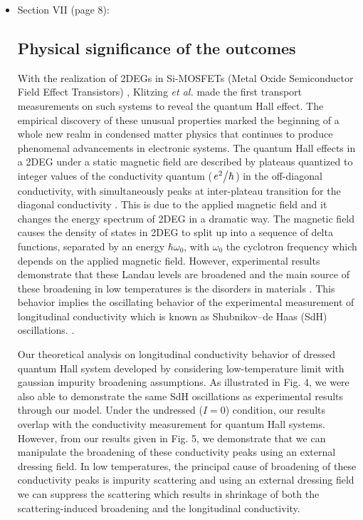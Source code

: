 \documentclass{article}
\begin{document}
\begin{itemize}
  \item Section VII (page 8):\\
  {\color{Maroon}
  \subsection*{Physical significance of the outcomes}

  With the realization of 2DEGs in Si-MOSFETs (Metal Oxide Semiconductor Field Effect Transistors) \cite{fowler66}, Klitzing \textit{et al.} \cite{klitzing80} made the first transport measurements on such systems to reveal the quantum Hall effect. The empirical discovery of these unusual properties marked the beginning of a whole new realm in condensed matter physics that continues to produce phenomenal advancements in electronic systems. The quantum Hall effects in a 2DEG under a static magnetic field are described by plateaus quantized to integer values of the conductivity quantum ($\flatfrac{e^2}{\hbar}$) in the off-diagonal conductivity, with simultaneously peaks at inter-plateau transition for the diagonal conductivity \cite{endo09}. This is due to the applied magnetic field and it changes the energy spectrum of 2DEG in a dramatic way. The magnetic field causes the density of states in 2DEG to split up into a sequence of delta functions, separated by an energy $\hbar\omega_0$, with $\omega_0$ the cyclotron frequency which depends on the applied magnetic field.
  However, experimental results demonstrate that these Landau levels are broadened and the main source of these broadening in low temperatures is the disorders in materials \cite{ando85,dial07}. This behavior implies the oscillating behavior of the experimental measurement of longitudinal conductivity which is known as Shubnikov–de Haas (SdH) oscillations. \cite{endo09,wakabayashi78}.

  Our theoretical analysis on longitudinal conductivity behavior of dressed quantum Hall system developed by considering low-temperature limit with gaussian impurity broadening assumptions. As illustrated in Fig. 4, we were also able to demonstrate the same SdH oscillations as experimental results \cite{endo09,wakabayashi78} through our model. Under the undressed ($I=0$) condition, our results overlap with the conductivity measurement for quantum Hall systems. However, from our results given in Fig. 5, we demonstrate that we can manipulate the broadening of these conductivity peaks using an external dressing field. In low temperatures, the principal cause of broadening of these conductivity peaks is impurity scattering and using an external dressing field we can suppress the scattering which results in shrinkage of both the scattering-induced broadening and the longitudinal conductivity.

}
\end{itemize}
\end{document}
